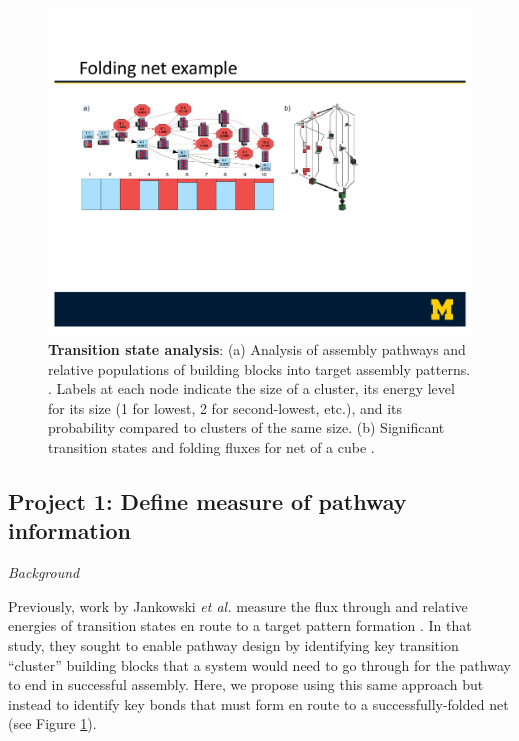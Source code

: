 \begin{figure}[tb]
\begin{center}
\includegraphics[width=6.5in]{../figures/bubba.pdf}
\caption{
\textbf{Transition state analysis}:
(a) Analysis of assembly pathways and relative populations of building blocks into target assembly patterns. \cite{Jankowski_2012_SoftMatter}.
Labels at each node indicate the size of a cluster, its energy level for its size (1 for lowest, 2 for second-lowest, etc.), and its probability compared to clusters of the same size. 
(b) Significant transition states and folding fluxes for net of a cube \cite{Dodd_2018_unpublished}. 
}
\label{fig:bubba}
\end{center}
\end{figure}

\subsection*{Project 1: Define measure of pathway information}

\textit{Background}

Previously, work by Jankowski \textit{et al.} measure the flux through and relative energies of transition states en route to a target pattern formation \cite{Jankowski_2012_SoftMatter}. 
In that study, they sought to enable pathway design by identifying key transition ``cluster'' building blocks that a system would need to go through for the pathway to end in successful assembly. 
Here, we propose using this same approach but instead to identify key bonds that must form en route to a successfully-folded net (see Figure \ref{fig:bubba}).

